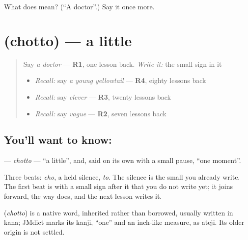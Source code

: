 \begin{tcolorbox}[breakable,colback=teal!4,colframe=teal!35!black,title={Before you move on}]
What does  mean? (\textquotedblleft{}A doctor\textquotedblright{}.) Say it once more.
\end{tcolorbox}
\section[\texorpdfstring{\ja{ちょっと} (chotto)}{ちょっと (chotto)}]{ (chotto) — a little}

\label{lesson:JA-C131-chotto}



\begin{quote}
Say \emph{a doctor} — \textbf{R1}, one lesson back. \emph{Write it:} the small sign in it

\begin{itemize}
\raggedright
  \item \emph{Recall:} say \emph{a young yellowtail} — \textbf{R4}, eighty lessons back
  \item \emph{Recall:} say \emph{clever} — \textbf{R3}, twenty lessons back
  \item \emph{Recall:} say \emph{vague} — \textbf{R2}, seven lessons back
\end{itemize}
\end{quote}

\subsection*{You'll want to know: }
\textbf{} — \emph{chotto} — \textquotedblleft{}a little\textquotedblright{}, and, said on its own with a small pause, \textquotedblleft{}one moment\textquotedblright{}.

Three beats: \emph{cho}, a held silence, \emph{to}. The silence is the small \textbf{} you already write. The first beat is \textbf{} with a small sign after it that you do not write yet; it joins forward, the way \textbf{} does, and the next lesson writes it.

\begin{cousinweb}
\textbf{} (\emph{chotto}) is a native word, inherited rather than borrowed, usually written in kana; JMdict marks its kanji, \textquotedblleft{}one\textquotedblright{} and an inch-like measure, as ateji. Its older origin is not settled.
\end{cousinweb}

